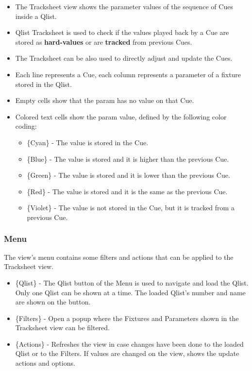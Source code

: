 \documentclass[
]{article}
\begin{document}
\begin{itemize}
\item
  The Tracksheet view shows the parameter values of the sequence of Cues inside a Qlist.
\item
  Qlist Tracksheet is used to check if the values played back by a Cue are stored as \textbf{hard-values} or are \textbf{tracked} from previous Cues.
\item
  The Tracksheet can be also used to directly adjust and update the Cues.
\end{itemize}

\begin{itemize}
\item
  Each line represents a Cue, each column represents a parameter of a fixture stored in the Qlist.
\item
  Empty cells show that the param has no value on that Cue.
\item
  Colored text cells show the param value, defined by the following color coding:

  \begin{itemize}
  \item
    \{Cyan\} - The value is stored in the Cue.
  \item
    \{Blue\} - The value is stored and it is higher than the previous Cue.
  \item
    \{Green\} - The value is stored and it is lower than the previous Cue.
  \item
    \{Red\} - The value is stored and it is the same as the previous Cue.
  \item
    \{Violet\} - The value is not stored in the Cue, but it is tracked from a previous Cue.
  \end{itemize}
\end{itemize}

\hypertarget{menu}{%
\subsubsection{Menu}\label{menu}}

The view's menu contains some filters and actions that can be applied to the Tracksheet view.

\begin{itemize}
\item
  \{Qlist\} - The Qlist button of the Menu is used to navigate and load the Qlist. Only one Qlist can be shown at a time. The loaded Qlist's number and name are shown on the button.
\item
  \{Filters\} - Open a popup where the Fixtures and Parameters shown in the Tracksheet view can be filtered.
\item
  \{Actions\} - Refreshes the view in case changes have been done to the loaded Qlist or to the Filters. If values are changed on the view, shows the update actions and options.
\end{itemize}
\end{document}
